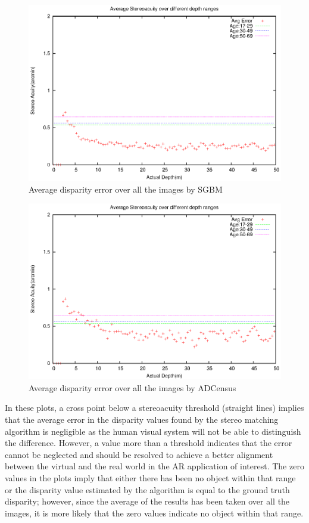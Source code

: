 \begin{figure}[H]
\centering
\includegraphics[scale=0.8]{sgbmmsk3}
\caption{Average disparity error over all the images by SGBM}
\label{fig:mskmapsgbm}
\end{figure} 

\begin{figure}[H]
\centering
\includegraphics[scale=0.8]{adcenmsk3}
\caption{Average disparity error over all the images by ADCensus}
\label{fig:mskmapadc}
\end{figure} 

In these plots, a cross point below a stereoacuity threshold (straight lines) implies that the average error in the disparity values found by the stereo matching 
algorithm is negligible as the human visual system will not be able to distinguish the difference. 
However, a value more than a threshold indicates that
the error cannot be neglected and should be resolved to achieve a better alignment between the virtual and the 
real world in the AR application of interest.
The zero values in the plots imply that either there has been no object within that range or the disparity value estimated by the algorithm
is equal to the ground truth disparity; however, since the average of the results has been taken over all the images, it is more likely that 
the zero values indicate no object within that range.

